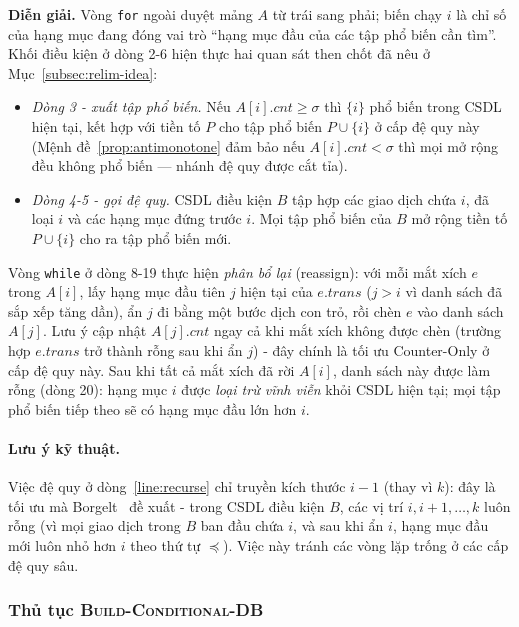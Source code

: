 \documentclass[12pt,a4paper]{report}
\begin{document}
\noindent
\textbf{Diễn giải.} Vòng \texttt{for} ngoài duyệt mảng $A$ từ trái sang phải;
biến chạy $i$ là chỉ số của hạng mục đang đóng vai trò ``hạng mục đầu của các
tập phổ biến cần tìm''. Khối điều kiện ở dòng 2-6 hiện thực hai quan sát then
chốt đã nêu ở Mục~\ref{subsec:relim-idea}:
\begin{itemize}
    \item \textit{Dòng 3 - xuất tập phổ biến.} Nếu $A[i].\mathit{cnt} \geq
    \sigma$ thì $\{i\}$ phổ biến trong CSDL hiện tại, kết hợp với tiền tố $P$
    cho tập phổ biến $P \cup \{i\}$ ở cấp đệ quy này (Mệnh đề~\ref{prop:antimonotone}
    đảm bảo nếu $A[i].\mathit{cnt} < \sigma$ thì mọi mở rộng đều không phổ
    biến --- nhánh đệ quy được cắt tỉa).
    \item \textit{Dòng 4-5 - gọi đệ quy.} CSDL điều kiện $B$ tập hợp các
    giao dịch chứa $i$, đã loại $i$ và các hạng mục đứng trước $i$. Mọi tập phổ
    biến của $B$ mở rộng tiền tố $P \cup \{i\}$ cho ra tập phổ biến mới.
\end{itemize}
Vòng \texttt{while} ở dòng 8-19 thực hiện \textit{phân bổ lại} (reassign): với
mỗi mắt xích $e$ trong $A[i]$, lấy hạng mục đầu tiên $j$ hiện tại của
$e.\mathit{trans}$ ($j > i$ vì danh sách đã sắp xếp tăng dần), ẩn $j$ đi bằng
một bước dịch con trỏ, rồi chèn $e$ vào danh sách $A[j]$. Lưu ý cập nhật
$A[j].\mathit{cnt}$ ngay cả khi mắt xích không được chèn (trường hợp
$e.\mathit{trans}$ trở thành rỗng sau khi ẩn $j$) - đây chính là tối ưu
Counter-Only ở cấp đệ quy này. Sau khi tất cả mắt xích đã rời $A[i]$, danh sách
này được làm rỗng (dòng 20): hạng mục $i$ được \textit{loại trừ vĩnh viễn} khỏi
CSDL hiện tại; mọi tập phổ biến tiếp theo sẽ có hạng mục đầu lớn hơn $i$.

\paragraph{Lưu ý kỹ thuật.}
Việc đệ quy ở dòng~\ref{line:recurse} chỉ truyền kích thước $i-1$ (thay vì
$k$): đây là tối ưu mà Borgelt~\cite[Section~2.4]{borgelt2005} đề xuất - trong
CSDL điều kiện $B$, các vị trí $i, i+1, \dots, k$ luôn rỗng (vì mọi giao dịch
trong $B$ ban đầu chứa $i$, và sau khi ẩn $i$, hạng mục đầu mới luôn nhỏ hơn
$i$ theo thứ tự $\preceq$). Việc này tránh các vòng lặp trống ở các cấp đệ quy
sâu.


\subsubsection*{Thủ tục \textsc{Build-Conditional-DB}}
\end{document}
